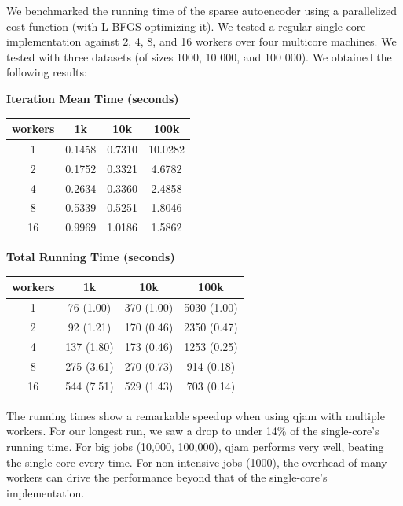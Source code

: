 \documentclass[%
  final,
  notitlepage,
  narroweqnarray,
  inline,
]{ieee}
\begin{document}
We benchmarked the running time of the sparse autoencoder using a parallelized
cost function (with L-BFGS optimizing it). We tested a regular single-core
implementation against 2, 4, 8, and 16 workers over four multicore machines. We
tested with three datasets (of sizes 1000, 10 000, and 100 000). We obtained
the following results:

\begin{center}

\textbf{Iteration Mean Time (seconds)} \\
\begin{tabular}{cccc}
workers  & 1k  &  10k   & 100k   \\
  \hline
1  & 0.1458 & 0.7310 & 10.0282 \\
2  & 0.1752 & 0.3321 & 4.6782 \\
4  & 0.2634 & 0.3360 & 2.4858 \\
8  & 0.5339 & 0.5251 & 1.8046 \\
16 & 0.9969 & 1.0186 & 1.5862 \\
\end{tabular}

\vspace{1em}
\textbf{Total Running Time (seconds)} \\
\begin{tabular}{cccc}
workers  & 1k  &  10k   & 100k   \\
  \hline
1  & 76 (1.00) & 370 (1.00) & 5030 (1.00) \\
2  & 92 (1.21) & 170 (0.46) & 2350 (0.47) \\
4  & 137 (1.80) & 173 (0.46) & 1253 (0.25) \\
8  & 275 (3.61) & 270 (0.73) & 914 (0.18) \\
16 & 544 (7.51) & 529 (1.43) & 703 (0.14) \\
\end{tabular}
\end{center}


The running times show a remarkable speedup when using qjam with multiple
workers. For our longest run, we saw a drop to under 14\% of the single-core's
running time. For big jobs (10,000, 100,000), qjam performs very well, beating
the single-core every time. For non-intensive jobs (1000), the overhead of many
workers can drive the performance beyond that of the single-core's
implementation.
\end{document}
